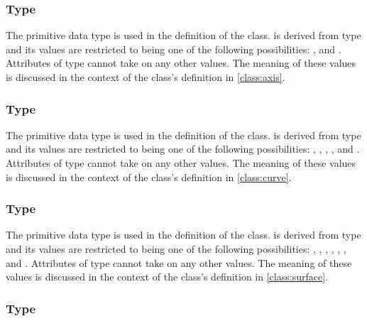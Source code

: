 \begin{blockChanged}
\subsubsection[\element{AxisType}]{Type }
\label{type:axisType}

The  primitive data type is used in the definition of the \Axis class.   is derived from type  and its values are restricted to being one of the following possibilities: , and .  Attributes of type  cannot take on any other values.  The meaning of these values is discussed in the context of the \Axis class's definition in \ref{class:axis}.

\subsubsection[\element{CurveType}]{Type }
\label{type:curveType}

The  primitive data type is used in the definition of the \Curve class.   is derived from type  and its values are restricted to being one of the following possibilities: , , , , and .  Attributes of type  cannot take on any other values.  The meaning of these values is discussed in the context of the \Curve class's definition in \ref{class:curve}.

\subsubsection[\element{SurfaceType}]{Type }
\label{type:surfaceType}

The  primitive data type is used in the definition of the \Surface class.   is derived from type  and its values are restricted to being one of the following possibilities: , , , , , , and .  Attributes of type  cannot take on any other values.  The meaning of these values is discussed in the context of the \Surface class's definition in \ref{class:surface}.

\subsubsection[\element{LineType}]{Type }
\label{type:lineType}


\end{blockChanged}
